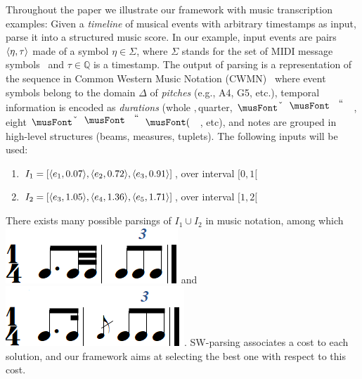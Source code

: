 \begin{example}\label{ex:running}
Throughout the paper we
illustrate our framework with music transcription examples: Given
a \emph{timeline} of musical events with arbitrary timestamps as input, parse it
into a structured music score. In our example, input events
are pairs $\< \eta, \tau>$ made of
a symbol $\eta \in \Sigma$, where $\Sigma$ stands for the
set of MIDI message symbols~\cite{?}
and  $\tau \in \mathbb{Q}$ is a timestamp. The output of parsing
is a representation of the sequence in
Common Western Music Notation (CWMN)~\cite{Gould11Notation}
where event symbols belong to the domain $\Delta$
of \emph{pitches} (e.g., A4, G5, etc.), temporal
information is encoded as \emph{durations} (whole \musWhole$,
$quarter, $\musQuarter$, eight $\musEighth$, etc), and notes are grouped in
high-level structures (beams, measures, tuplets). The following inputs
will be used:
\begin{enumerate}
  \item $I_1  = [ \<e_1, 0.07>,\<e_2, 0.72>, \<e_3, 0.91>]$, over interval $[0,1[$
  \item $I_2  = [ \<e_3, 1.05>,\<e_4, 1.36>, \<e_5, 1.71>]$, over interval $[1,2[$
\end{enumerate}
There exists many possible parsings of $I_1 \cup I_2$ in music notation, among
which
\includegraphics[scale=0.20]{pictures/score5.png}
and \includegraphics[scale=0.20]{pictures/score4.png}.  
SW-parsing associates a cost 
to each solution, and our framework
aims at selecting the best one with respect to this cost.
\endex
\end{example}
